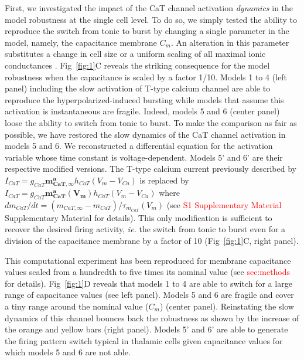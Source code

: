 First, we investigated the impact of the CaT channel activation \textit{dynamics} in the model robustness at the single cell level. To do so, we simply tested the ability to reproduce the switch from tonic to burst by changing a single parameter in the model, namely, the capacitance membrane $C_m$. An alteration in this parameter substitutes a change in cell size or a uniform scaling of all maximal ionic conductances \citep{oleary_cell_2014, franci_robust_2018} . Fig~\ref{fig:1}C reveals the striking consequence for the model robustness when the capacitance is scaled by a factor 1/10. Models 1 to 4 (left panel) including the slow activation of T-type calcium channel are able to reproduce the hyperpolarized-induced bursting while models that assume this activation is instantaneous are fragile. Indeed, models 5 and 6 (center panel) loose the ability to switch from tonic to burst. To make the comparison as fair as possible, we have restored the slow dynamics of the CaT channel activation in models 5 and 6. We reconstructed a differential equation for the activation variable whose time constant is voltage-dependent. Models 5' and 6' are their respective modified versions.  The T-type calcium current previously described by $I_{CaT} = g_{CaT} \boldsymbol{m^a_{CaT, \infty}} h_{CaT} (V_m- V_{Ca})$ is replaced by $ I_{CaT} = g_{CaT} \boldsymbol{m^a_{CaT}(V_m)} h_{CaT} (V_m- V_{Ca})$ where $dm_{CaT}/dt = (m_{CaT,\infty}-m_{CaT})/\tau_{m_{CaT}}(V_m)$ (see \textcolor{red}{S1 Supplementary Material} Supplementary Material for details). This only modification  is sufficient to recover the desired firing activity, \textit{ie.} the switch from tonic to burst even for a division of the capacitance membrane by a factor of 10 (Fig~\ref{fig:1}C, right panel). 

This computational experiment has been reproduced for membrane capacitance values scaled from a hundredth to five times its nominal value (see \textcolor{red}{sec:methods} for details). Fig~\ref{fig:1}D reveals that models 1 to 4 are able to switch for a large range of capacitance values (see left panel). Models 5 and 6 are fragile and cover a tiny range around the nominal value ($C_m$) (center panel). Reinstating the slow dynamics of this channel bounces back the robustness as shown by the increase of the orange and yellow bars (right panel). Models 5' and 6' are able to generate the firing pattern switch typical in thalamic cells  given capacitance values for which models 5 and 6 are not able.

